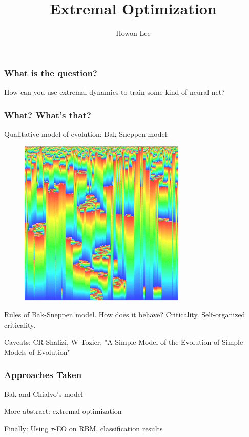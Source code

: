\documentclass{beamer}
\begin{document}
\title{Extremal Optimization}
\author{Howon Lee}
\maketitle

\begin{frame}
  \frametitle{What is the question?}
  How can you use extremal dynamics to train some kind of neural net?
\end{frame}

\begin{frame}
  \frametitle{What? What's that?}
  Qualitative model of evolution: Bak-Sneppen model.
  \begin{figure}
    \includegraphics{bak_sneppen}
  \end{figure}

  Rules of Bak-Sneppen model. How does it behave? Criticality. Self-organized criticality.

  Caveats: CR Shalizi, W Tozier, "A Simple Model of the Evolution of Simple Models of Evolution"
\end{frame}

\begin{frame}
  \frametitle{Approaches Taken}
  Bak and Chialvo's model

  More abstract: extremal optimization

  Finally: Using $\tau$-EO on RBM, classification results
\end{frame}
\end{document}
